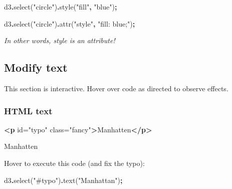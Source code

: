 \documentclass[
  openany]{book}
\newenvironment{Shaded}{\begin{snugshade}}{\end{snugshade}}
\newcommand{\FunctionTok}[1]{\textcolor[rgb]{0.00,0.00,0.00}{#1}}
\newcommand{\KeywordTok}[1]{\textcolor[rgb]{0.13,0.29,0.53}{\textbf{#1}}}
\newcommand{\NormalTok}[1]{#1}
\newcommand{\OperatorTok}[1]{\textcolor[rgb]{0.81,0.36,0.00}{\textbf{#1}}}
\newcommand{\OtherTok}[1]{\textcolor[rgb]{0.56,0.35,0.01}{#1}}
\newcommand{\StringTok}[1]{\textcolor[rgb]{0.31,0.60,0.02}{#1}}
\begin{document}
\begin{Shaded}
\begin{Highlighting}[]
\NormalTok{d3}\OperatorTok{.}\FunctionTok{select}\NormalTok{(}\StringTok{"circle"}\NormalTok{)}\OperatorTok{.}\FunctionTok{style}\NormalTok{(}\StringTok{"fill"}\OperatorTok{,} \StringTok{"blue"}\NormalTok{)}\OperatorTok{;}

\NormalTok{d3}\OperatorTok{.}\FunctionTok{select}\NormalTok{(}\StringTok{"circle"}\NormalTok{)}\OperatorTok{.}\FunctionTok{attr}\NormalTok{(}\StringTok{"style"}\OperatorTok{,} \StringTok{"fill: blue;"}\NormalTok{)}\OperatorTok{;}
\end{Highlighting}
\end{Shaded}

\emph{In other words, style is an attribute!}

\hypertarget{modify-text}{%
\subsection{Modify text}\label{modify-text}}

This section is interactive. Hover over code as directed to observe effects.

\hypertarget{html-text}{%
\subsubsection*{HTML text}\label{html-text}}

\begin{Shaded}
\begin{Highlighting}[]
\KeywordTok{\textless{}p}\OtherTok{ id=}\StringTok{"typo"}\OtherTok{ class=}\StringTok{"fancy"}\KeywordTok{\textgreater{}}\NormalTok{Manhatten}\KeywordTok{\textless{}/p\textgreater{}}
\end{Highlighting}
\end{Shaded}

Manhatten

Hover to execute this code (and fix the typo):

\hypertarget{fixtypo}{}
\begin{Shaded}
\begin{Highlighting}[]
\NormalTok{d3}\OperatorTok{.}\FunctionTok{select}\NormalTok{(}\StringTok{"\#typo"}\NormalTok{)}\OperatorTok{.}\FunctionTok{text}\NormalTok{(}\StringTok{"Manhattan"}\NormalTok{)}\OperatorTok{;}
\end{Highlighting}
\end{Shaded}
\end{document}
